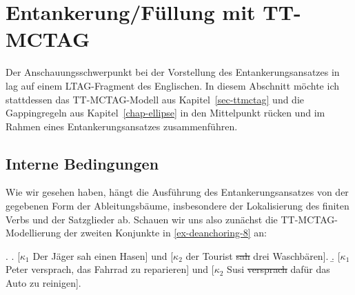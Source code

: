 \section{Entankerung/Füllung mit TT-MCTAG}\label{sec-deanchoring-ttmctag}

Der Anschauungsschwerpunkt bei der Vorstellung des Entankerungsansatzes in \cite{Lichte:Kallmeyer:10} lag auf einem LTAG-Fragment des Englischen. In diesem Abschnitt möchte ich stattdessen das TT-MCTAG-Modell aus Kapitel~\ref{sec-ttmctag} und die Gappingregeln aus Kapitel~\ref{chap-ellipse} in den Mittelpunkt rücken und im Rahmen eines Entankerungsansatzes zusammenführen. 


\subsection{Interne Bedingungen}

Wie wir gesehen haben, hängt die Ausführung des Entankerungsansatzes von der gegebenen Form der Ableitungsbäume, insbesondere der Lokalisierung des finiten Verbs und der Satzglieder ab. Schauen wir uns also zunächst die TT-MCTAG-Modellierung der zweiten Konjunkte in \ref{ex-deanchoring-8} an:

\ex. \label{ex-deanchoring-8}
\a. \label{ex-deanchoring-8-a} [$\kappa_1$ Der Jäger sah einen Hasen] und [$\kappa_2$ der Tourist \sout{sah} drei Waschbären].
\b. \label{ex-deanchoring-8-b} [$\kappa_1$ Peter versprach, das Fahrrad zu reparieren] und [$\kappa_2$ Susi \sout{versprach} dafür das Auto zu reinigen].

